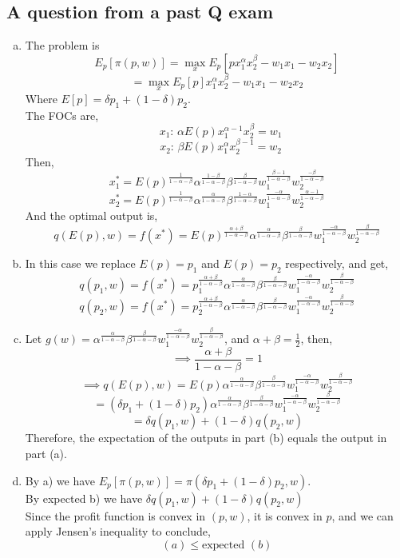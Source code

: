 \documentclass{article}
\begin{document}
\subsection*{A question from a past Q exam}
\begin{enumerate}[(a)]
    \item The problem is
    \[E_p[\pi(p,w)] = \max_x E_p[px_1^{\alpha}x_2^{\beta}-w_1x_1-w_2x_2]\]
    \[=\max_x E_p[p]x_1^{\alpha}x_2^{\beta}-w_1x_1-w_2x_2\]
    Where $E[p]= \delta p_1+(1-\delta)p_2$.\\
    \bigskip
    The FOCs are,
    \[\text{ $x_1$: } \alpha E(p)x_1^{\alpha-1}x_2^{\beta} = w_1\]
    \[\text{ $x_2$: } \beta E(p)x_1^{\alpha}x_2^{\beta-1} = w_2\]
    Then,
    \[x_1^* = E(p)^{\frac{1}{1-\alpha-\beta}}\alpha^{\frac{1-\beta}{1-\alpha-\beta}}\beta^{\frac{\beta}{1-\alpha-\beta}}w_1^{\frac{\beta-1}{1-\alpha-\beta}}w_2^{\frac{-\beta}{1-\alpha-\beta}}\]
    \[x_2^* = E(p)^{\frac{1}{1-\alpha-\beta}}\alpha^{\frac{\alpha}{1-\alpha-\beta}}\beta^{\frac{1-\alpha}{1-\alpha-\beta}}w_1^{\frac{-\alpha}{1-\alpha-\beta}}w_2^{\frac{\alpha-1}{1-\alpha-\beta}}\]
    And the optimal output is,
    \[q(E(p),w) = f(x^*) = E(p)^{\frac{\alpha+\beta}{1-\alpha-\beta}}\alpha^{\frac{\alpha}{1-\alpha-\beta}}\beta^{\frac{\beta}{1-\alpha-\beta}}w_1^{\frac{-\alpha}{1-\alpha-\beta}}w_2^{\frac{\beta}{1-\alpha-\beta}}\]

    \item 
    In this case we replace $E(p) = p_1$ and $E(p) = p_2$ respectively, and get,
    \[q(p_1,w) = f(x^*) = p_1^{\frac{\alpha+\beta}{1-\alpha-\beta}}\alpha^{\frac{\alpha}{1-\alpha-\beta}}\beta^{\frac{\beta}{1-\alpha-\beta}}w_1^{\frac{-\alpha}{1-\alpha-\beta}}w_2^{\frac{\beta}{1-\alpha-\beta}}\]
    \[q(p_2,w) = f(x^*) = p_2^{\frac{\alpha+\beta}{1-\alpha-\beta}}\alpha^{\frac{\alpha}{1-\alpha-\beta}}\beta^{\frac{\beta}{1-\alpha-\beta}}w_1^{\frac{-\alpha}{1-\alpha-\beta}}w_2^{\frac{\beta}{1-\alpha-\beta}}\]

    \item 
    Let $g(w) = \alpha^{\frac{\alpha}{1-\alpha-\beta}}\beta^{\frac{\beta}{1-\alpha-\beta}}w_1^{\frac{-\alpha}{1-\alpha-\beta}}w_2^{\frac{\beta}{1-\alpha-\beta}}$, and $\alpha + \beta = \frac{1}{2}$, then,
    \[\implies \frac{\alpha+\beta}{1-\alpha-\beta} = 1\]
    \[\implies q(E(p),w) = E(p)\alpha^{\frac{\alpha}{1-\alpha-\beta}}\beta^{\frac{\beta}{1-\alpha-\beta}}w_1^{\frac{-\alpha}{1-\alpha-\beta}}w_2^{\frac{\beta}{1-\alpha-\beta}}\]
    \[=(\delta p_1+(1-\delta)p_2)\alpha^{\frac{\alpha}{1-\alpha-\beta}}\beta^{\frac{\beta}{1-\alpha-\beta}}w_1^{\frac{-\alpha}{1-\alpha-\beta}}w_2^{\frac{\beta}{1-\alpha-\beta}}\]
    \[=\delta q(p_1,w) + (1-\delta)q(p_2,w)\]
    Therefore, the expectation of the outputs in part (b) equals the output in part (a).

    \item 
    By a) we have $E_p[\pi(p,w)] = \pi(\delta p_1+(1-\delta)p_2,w)$.\\
    By expected b) we have $\delta q(p_1,w) + (1-\delta)q(p_2,w)$\\
    Since the profit function is convex in $(p,w)$, it is convex in $p$, and we can apply Jensen's inequality to conclude,
    \[(a) \leq \text{expected } (b)\]
    \end{enumerate}
\end{document}
